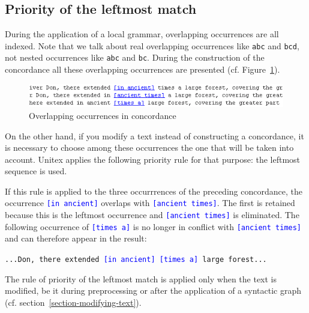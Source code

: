 \subsection{Priority of the leftmost match}
\label{section-priority-leftmost-match}
 
During the application of a local grammar, overlapping occurrences
are all indexed. Note that we talk about real overlapping occurrences like
\verb+abc+ and \verb+bcd+, not nested occurrences like \verb+abc+ and
\verb+bc+. During the construction of the concordance all these overlapping 
occurrences are presented (cf. Figure~\ref{fig-overlappping-occurrences}).

\begin{figure}[!h]
\begin{center}
\includegraphics[width=13cm]{resources/img/fig6-24.png}
\caption{Overlapping occurrences in concordance\label{fig-overlappping-occurrences}}
\end{center}
\end{figure}

\noindent On the other hand, if you modify a text instead of constructing a
concordance, it is necessary to choose among these occurrences the one  that will be taken into account.
Unitex applies the following priority rule for that purpose: the leftmost
sequence is used.

\bigskip
\noindent If this rule is applied to the three occurrrences of the preceding
concordance, the occurrence \textcolor{blue}{\texttt{[in ancient]}} overlaps with
\textcolor{blue}{\texttt{[ancient times]}}. The first  is retained because this
is the leftmost occurrence and \textcolor{blue}{\texttt{[ancient times]}} is
eliminated. The following occurrence of \textcolor{blue}{\texttt{[times a]}} is
no longer in conflict with \textcolor{blue}{\texttt{[ancient times]}} and can
therefore appear in the result:
\begin{center}
\texttt{...Don, there extended \textcolor{blue}{[in ancient] [times a]} large forest...}
\end{center}

\noindent The rule of priority of the leftmost match is applied only when the
text is modified, be it during preprocessing or after the application of a syntactic
graph (cf. section~\ref{section-modifying-text}).

